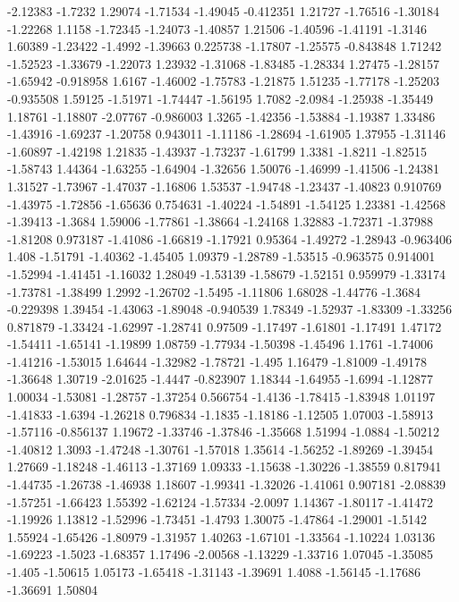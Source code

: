 \documentclass[9pt]{article}
\theoremstyle{plain}
\theoremstyle{definition}
\theoremstyle{remark}
\numberwithin{equation}{section}
\begin{document}
-2.12383
-1.7232
1.29074
-1.71534
-1.49045
-0.412351
1.21727
-1.76516
-1.30184
-1.22268
1.1158
-1.72345
-1.24073
-1.40857
1.21506
-1.40596
-1.41191
-1.3146
1.60389
-1.23422
-1.4992
-1.39663
0.225738
-1.17807
-1.25575
-0.843848
1.71242
-1.52523
-1.33679
-1.22073
1.23932
-1.31068
-1.83485
-1.28334
1.27475
-1.28157
-1.65942
-0.918958
1.6167
-1.46002
-1.75783
-1.21875
1.51235
-1.77178
-1.25203
-0.935508
1.59125
-1.51971
-1.74447
-1.56195
1.7082
-2.0984
-1.25938
-1.35449
1.18761
-1.18807
-2.07767
-0.986003
1.3265
-1.42356
-1.53884
-1.19387
1.33486
-1.43916
-1.69237
-1.20758
0.943011
-1.11186
-1.28694
-1.61905
1.37955
-1.31146
-1.60897
-1.42198
1.21835
-1.43937
-1.73237
-1.61799
1.3381
-1.8211
-1.82515
-1.58743
1.44364
-1.63255
-1.64904
-1.32656
1.50076
-1.46999
-1.41506
-1.24381
1.31527
-1.73967
-1.47037
-1.16806
1.53537
-1.94748
-1.23437
-1.40823
0.910769
-1.43975
-1.72856
-1.65636
0.754631
-1.40224
-1.54891
-1.54125
1.23381
-1.42568
-1.39413
-1.3684
1.59006
-1.77861
-1.38664
-1.24168
1.32883
-1.72371
-1.37988
-1.81208
0.973187
-1.41086
-1.66819
-1.17921
0.95364
-1.49272
-1.28943
-0.963406
1.408
-1.51791
-1.40362
-1.45405
1.09379
-1.28789
-1.53515
-0.963575
0.914001
-1.52994
-1.41451
-1.16032
1.28049
-1.53139
-1.58679
-1.52151
0.959979
-1.33174
-1.73781
-1.38499
1.2992
-1.26702
-1.5495
-1.11806
1.68028
-1.44776
-1.3684
-0.229398
1.39454
-1.43063
-1.89048
-0.940539
1.78349
-1.52937
-1.83309
-1.33256
0.871879
-1.33424
-1.62997
-1.28741
0.97509
-1.17497
-1.61801
-1.17491
1.47172
-1.54411
-1.65141
-1.19899
1.08759
-1.77934
-1.50398
-1.45496
1.1761
-1.74006
-1.41216
-1.53015
1.64644
-1.32982
-1.78721
-1.495
1.16479
-1.81009
-1.49178
-1.36648
1.30719
-2.01625
-1.4447
-0.823907
1.18344
-1.64955
-1.6994
-1.12877
1.00034
-1.53081
-1.28757
-1.37254
0.566754
-1.4136
-1.78415
-1.83948
1.01197
-1.41833
-1.6394
-1.26218
0.796834
-1.1835
-1.18186
-1.12505
1.07003
-1.58913
-1.57116
-0.856137
1.19672
-1.33746
-1.37846
-1.35668
1.51994
-1.0884
-1.50212
-1.40812
1.3093
-1.47248
-1.30761
-1.57018
1.35614
-1.56252
-1.89269
-1.39454
1.27669
-1.18248
-1.46113
-1.37169
1.09333
-1.15638
-1.30226
-1.38559
0.817941
-1.44735
-1.26738
-1.46938
1.18607
-1.99341
-1.32026
-1.41061
0.907181
-2.08839
-1.57251
-1.66423
1.55392
-1.62124
-1.57334
-2.0097
1.14367
-1.80117
-1.41472
-1.19926
1.13812
-1.52996
-1.73451
-1.4793
1.30075
-1.47864
-1.29001
-1.5142
1.55924
-1.65426
-1.80979
-1.31957
1.40263
-1.67101
-1.33564
-1.10224
1.03136
-1.69223
-1.5023
-1.68357
1.17496
-2.00568
-1.13229
-1.33716
1.07045
-1.35085
-1.405
-1.50615
1.05173
-1.65418
-1.31143
-1.39691
1.4088
-1.56145
-1.17686
-1.36691
1.50804
\end{document}
